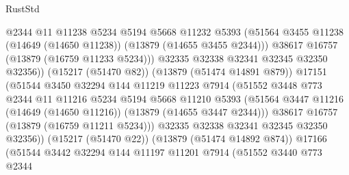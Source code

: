 \begin{lexlean}{RustStd}
\begin{coremodule}
                              @2344
                              @11
                              @11238
                              @5234
                              @5194
                              @5668
                              @11232
                              @5393
                              (@51564
                                @3455
                                @11238
                                (@14649 (@14650 @11238))
                                (@13879 (@14655 @3455 @2344)))
                              @38617
                              @16757
                              (@13879 (@16759 @11233 @5234)))
                            @32335
                            @32338
                            @32341
                            @32345
                            @32350
                            @32356))
                        (@15217 (@51470 @82))
                        (@13879 (@51474 @14891 @879))
                        @17151
                        (@51544
                          @3450
                          @32294
                          @144
                          @11219
                          @11223
                          @7914
                          (@51552
                            @3448
                            @773
                            @2344
                            @11
                            @11216
                            @5234
                            @5194
                            @5668
                            @11210
                            @5393
                            (@51564
                              @3447
                              @11216
                              (@14649 (@14650 @11216))
                              (@13879 (@14655 @3447 @2344)))
                            @38617
                            @16757
                            (@13879 (@16759 @11211 @5234)))
                          @32335
                          @32338
                          @32341
                          @32345
                          @32350
                          @32356))
                      (@15217 (@51470 @22))
                      (@13879 (@51474 @14892 @874))
                      @17166
                      (@51544
                        @3442
                        @32294
                        @144
                        @11197
                        @11201
                        @7914
                        (@51552
                          @3440
                          @773
                          @2344

\end{coremodule}
\end{lexlean}
